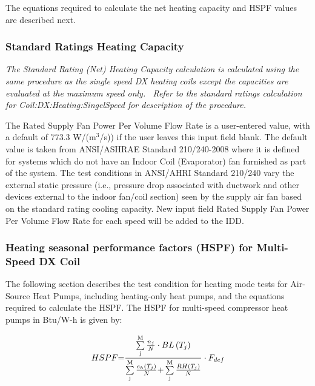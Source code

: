 The equations required to calculate the net heating capacity and HSPF values are described next.

\subsubsection{Standard Ratings Heating Capacity}\label{standard-ratings-heating-capacity}

\emph{The Standard Rating (Net) Heating Capacity calculation is calculated using the same procedure as the single speed DX heating coils except the capacities are evaluated at the maximum speed only.~ Refer to the standard ratings calculation for Coil:DX:Heating:SingelSpeed for description of the procedure.}

The Rated Supply Fan Power Per Volume Flow Rate is a user-entered value, with a default of 773.3 W/(m\(^{3}\)/s)) if the user leaves this input field blank. The default value is taken from ANSI/ASHRAE Standard 210/240-2008 where it is defined for systems which do not have an Indoor Coil (Evaporator) fan furnished as part of the system. The test conditions in ANSI/AHRI Standard 210/240 vary the external static pressure (i.e., pressure drop associated with ductwork and other devices external to the indoor fan/coil section) seen by the supply air fan based on the standard rating cooling capacity. New input field Rated Supply Fan Power Per Volume Flow Rate for each speed will be added to the IDD.

\subsubsection{Heating seasonal performance factors (HSPF) for Multi-Speed DX Coil}\label{heating-seasonal-performance-factors-hspf-for-multi-speed-dx-coil}

The following section describes the test condition for heating mode tests for Air-Source Heat Pumps, including heating-only heat pumps, and the equations required to calculate the HSPF. The HSPF for multi-speed compressor heat pumps in Btu/W-h is given by:

\begin{equation}
HSPF{\rm{ = }}\frac{{\sum\limits_{\rm{j}}^{\rm{M}} {\frac{{{n_j}}}{N} \cdot BL\left( {{T_j}} \right)} }}{{\sum\limits_{\rm{j}}^{\rm{M}} {\frac{{{e_h}\left( {{T_j}} \right)}}{N}{\rm{ + }}} \sum\limits_{\rm{j}}^{\rm{M}} {\frac{{RH\left( {{T_j}} \right)}}{N}} }} \cdot {F_{def}}
\end{equation}

